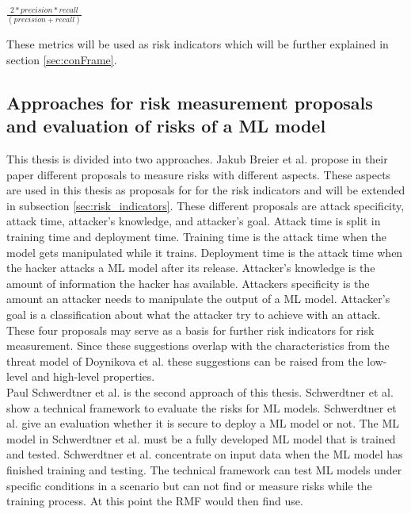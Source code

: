 \begin{center}
  $\frac{2 * precision * recall}{(precision + recall)}$
\end{center}

These metrics will be used as risk indicators which will be further explained in section \ref{sec:conFrame}.

\subsection{Approaches for risk measurement proposals and evaluation of risks of a ML model}
\label{sec:approaches}

This thesis is divided into two approaches. Jakub Breier et al. \cite{DBLP:journals/corr/abs-2012-04884} propose in their paper different proposals to measure risks with different
aspects. These aspects are used in this thesis as proposals for for the risk indicators and will be extended in subsection \ref{sec:risk_indicators}. These different proposals are attack specificity, attack time, attacker's knowledge, and attacker's goal. Attack time is split in training time and deployment time. Training time is the attack time when the model gets manipulated while it trains. Deployment time is the attack time when the hacker attacks a ML model after its release. Attacker's knowledge is the amount of information the hacker has available. Attackers specificity is the amount an attacker needs to manipulate the output of a
ML model. Attacker's goal is a classification about what the attacker try to achieve with an attack. These four proposals may serve as a basis for further risk indicators for risk measurement. Since these suggestions overlap with the characteristics from the threat model of Doynikova et al. these suggestions can be raised from the low-level and high-level properties.\\
Paul Schwerdtner et al. \cite{DBLP:journals/corr/abs-2011-04328} is the second approach of this thesis. Schwerdtner et al. show a technical framework to evaluate the risks for ML models.
Schwerdtner et al. give an evaluation whether it is secure to deploy a ML model or not. The ML model in Schwerdtner et al. must be a fully developed ML model that is trained and tested.
Schwerdtner et al. concentrate on input data when the ML model has finished training and testing. The technical framework can test ML models under specific conditions in a scenario but can not find or measure risks while the training process. At this point the RMF would then find use.\\

